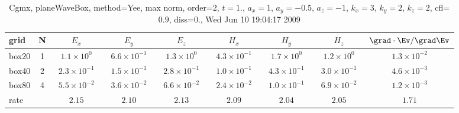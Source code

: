 \begin{table}[hbt]\tableFont %
\begin{center}
\begin{tabular}{|l|c|c|c|c|c|c|c|c|} \hline 
grid  & N &  $E_x$ &  $E_y$ & $E_z$ &  $H_x$ &  $H_y$ & $H_z$ & $\grad\cdot\Ev/\grad\Ev$\\ \hline 
               box20 &     1 & ~$1.1\times10^{  0}$~ & ~$6.6\times10^{ -1}$~ & ~$1.3\times10^{  0}$~ & ~$4.3\times10^{ -1}$~ & ~$1.7\times10^{  0}$~ & ~$1.2\times10^{  0}$~ & ~$1.3\times10^{ -2}$~  \\ \hline
               box40 &     2 & ~$2.3\times10^{ -1}$~ & ~$1.5\times10^{ -1}$~ & ~$2.8\times10^{ -1}$~ & ~$1.0\times10^{ -1}$~ & ~$4.3\times10^{ -1}$~ & ~$3.0\times10^{ -1}$~ & ~$4.6\times10^{ -3}$~  \\ \hline
               box80 &     4 & ~$5.5\times10^{ -2}$~ & ~$3.6\times10^{ -2}$~ & ~$6.6\times10^{ -2}$~ & ~$2.4\times10^{ -2}$~ & ~$1.0\times10^{ -1}$~ & ~$6.9\times10^{ -2}$~ & ~$1.2\times10^{ -3}$~  \\ \hline
    rate             &       &       $2.15$          &       $2.10$          &       $2.13$          &       $2.09$          &       $2.04$          &       $2.05$          &       $1.71$           \\ \hline
\end{tabular}
\caption{Cgmx, planeWaveBox, method=Yee, max norm, order=$2$, $t=1.$, $a_x=1$,  $a_y=-0.5$, $a_z=-1$,  $k_x=3$,  $k_y=2$, $k_z=2$, cfl=$0.9$, diss=$0.$, Wed Jun 10 19:04:17 2009}\label{table:planeWaveBoxYeeOrder2max}
\end{center}
\end{table}
